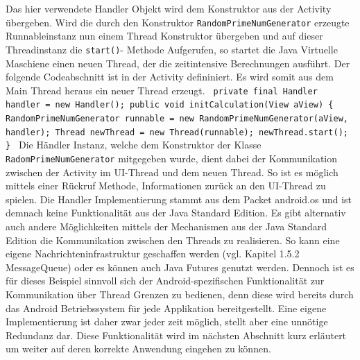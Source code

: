 \documentclass[12pt,oneside,a4paper,bibtotoc,liststotoc]{scrreprt}
\begin{document}
Das hier verwendete Handler Objekt wird dem Konstruktor aus der Activity übergeben. Wird die durch den Konstruktor \texttt{RandomPrimeNumGenerator} erzeugte Runnableinstanz nun einem Thread Konstruktor übergeben und auf dieser Threadinstanz die \texttt{start()}- Methode Aufgerufen, so startet die Java Virtuelle Maschiene einen neuen Thread, der die zeitintensive Berechnungen ausführt. Der folgende Codeabschnitt ist in der Activity defininiert. Es wird somit aus dem Main Thread heraus ein neuer Thread erzeugt.\newline\newline\newline
\texttt{
private final Handler handler = new Handler();\newline\newline
public void initCalculation(View aView)\newline
  \{ \newline
     RandomPrimeNumGenerator runnable =
        new RandomPrimeNumGenerator(aView, handler);\newline\newline  
     Thread newThread = new Thread(runnable);\newline
     newThread.start();\newline
  \} \newline
} \newline
Die Händler Instanz, welche dem Konstruktor der Klasse \texttt{RadomPrimeNumGenerator} mitgegeben wurde, dient dabei der Kommunikation zwischen der Activity im UI-Thread und dem neuen Thread. So ist es möglich mittels einer Rückruf Methode, Informationen zurück an den UI-Thread zu spielen. Die Handler Implementierung stammt aus dem Packet android.os und ist demnach keine Funktionalität aus der Java Standard Edition. Es gibt alternativ auch andere Möglichkeiten mittels der Mechanismen aus der Java Standard Edition die Kommunikation zwischen den Threads zu realisieren. So kann eine eigene Nachrichteninfrastruktur geschaffen werden (vgl. Kapitel 1.5.2 MessageQueue) oder es können auch Java Futures genutzt werden. Dennoch ist es für dieses Beispiel sinnvoll sich der Android-spezifischen Funktionalität zur Kommunikation über Thread Grenzen zu bedienen, denn diese wird bereits durch das Android Betriebssystem für jede Applikation bereitgestellt. Eine eigene Implementierung ist daher zwar jeder zeit möglich, stellt aber eine unnötige Redundanz dar. Diese Funktionalität wird im nächsten Abschnitt kurz erläutert um weiter auf deren korrekte Anwendung eingehen zu können.
\end{document}
